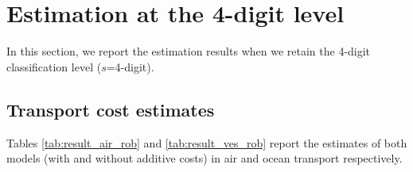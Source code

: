 \documentclass[a4paper,11pt]{article}
\begin{document}
\clearpage
\setcounter{table}{0}
\setcounter{figure}{0}
\renewcommand{\thefigure}{C.\arabic{figure}}
\renewcommand{\thetable}{C.\arabic{table}}

\section{Estimation at the 4-digit level \label{app:4digit}}

In this section, we report the estimation results when we retain the 4-digit classification level ($s$=4-digit).

\subsection{Transport cost estimates}


Tables \ref{tab:result_air_rob} and \ref{tab:result_ves_rob} report the estimates of both models (with and without additive costs) in air and ocean transport respectively.
\end{document}
